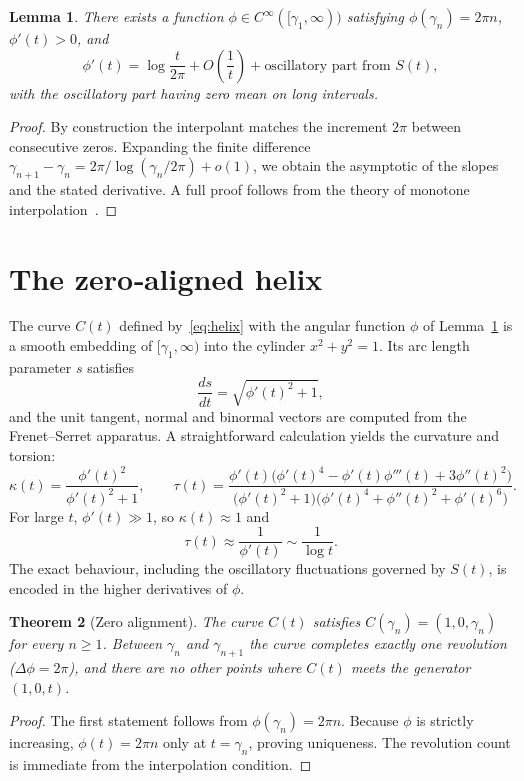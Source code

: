 \documentclass[12pt,a4paper]{article}
\newtheorem{theorem}{Theorem}[section]
\newtheorem{lemma}[theorem]{Lemma}
\begin{document}
\begin{lemma}\label{lem:phi}
There exists a function $\phi\in C^\infty([\gamma_1,\infty))$ satisfying $\phi(\gamma_n)=2\pi n$, $\phi'(t)>0$, and
\[
  \phi'(t) = \log\frac{t}{2\pi} + O\!\left(\frac{1}{t}\right) + \text{oscillatory part from $S(t)$},
\]
with the oscillatory part having zero mean on long intervals.
\end{lemma}
\begin{proof}
By construction the interpolant matches the increment $2\pi$ between consecutive zeros. Expanding the finite difference $\gamma_{n+1}-\gamma_n = 2\pi/\log(\gamma_n/2\pi) + o(1)$, we obtain the asymptotic of the slopes and the stated derivative. A full proof follows from the theory of monotone interpolation~\cite{fritsch1980}.
\end{proof}

\section{The zero‑aligned helix}
The curve $C(t)$ defined by~\eqref{eq:helix} with the angular function $\phi$ of Lemma~\ref{lem:phi} is a smooth embedding of $[\gamma_1,\infty)$ into the cylinder $x^2+y^2=1$. Its arc length parameter $s$ satisfies
\[
  \frac{ds}{dt} = \sqrt{\phi'(t)^2+1},
\]
and the unit tangent, normal and binormal vectors are computed from the Frenet–Serret apparatus. A straightforward calculation yields the curvature and torsion:
\begin{equation}
  \kappa(t) = \frac{\phi'(t)^2}{\phi'(t)^2+1},\qquad
  \tau(t) = \frac{\phi'(t)\bigl(\phi'(t)^4 - \phi'(t)\phi'''(t) + 3\phi''(t)^2\bigr)}
                  {\bigl(\phi'(t)^2+1\bigr)\bigl(\phi'(t)^4+\phi''(t)^2+\phi'(t)^6\bigr)}.
  \label{eq:kappatau}
\end{equation}
For large $t$, $\phi'(t)\gg 1$, so $\kappa(t)\approx 1$ and
\[
  \tau(t) \approx \frac{1}{\phi'(t)} \sim \frac{1}{\log t}.
\]
The exact behaviour, including the oscillatory fluctuations governed by $S(t)$, is encoded in the higher derivatives of $\phi$.

\begin{theorem}[Zero alignment]\label{thm:zeroalign}
The curve $C(t)$ satisfies $C(\gamma_n)=(1,0,\gamma_n)$ for every $n\ge 1$. Between $\gamma_n$ and $\gamma_{n+1}$ the curve completes exactly one revolution ($\Delta\phi=2\pi$), and there are no other points where $C(t)$ meets the generator $(1,0,t)$.
\end{theorem}
\begin{proof}
The first statement follows from $\phi(\gamma_n)=2\pi n$. Because $\phi$ is strictly increasing, $\phi(t)=2\pi n$ only at $t=\gamma_n$, proving uniqueness. The revolution count is immediate from the interpolation condition.
\end{proof}
\end{document}
